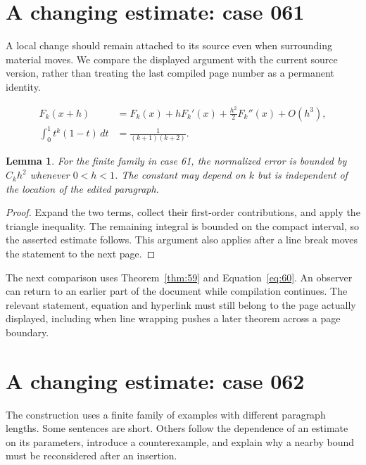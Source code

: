 \documentclass[a4paper,10pt]{article}
\newtheorem{lemma}[theorem]{Lemma}
\begin{document}
\lipsum[23]

\section{A changing estimate: case 061}\label{unit:60}
A local change should remain attached to its source even when surrounding material moves. We compare the displayed argument with the current source version, rather than treating the last compiled page number as a permanent identity.

\lipsum[1-2]
\begin{align}\label{eq:60}
 F_k(x+h)&=F_k(x)+hF_k'(x)+\frac{h^2}{2}F_k''(x)+O(h^3),\\
 \int_0^1 t^k(1-t)\,dt&=\frac{1}{(k+1)(k+2)}.
\end{align}
\begin{lemma}\label{thm:60}
For the finite family in case 61, the normalized error is bounded by $C_k h^2$ whenever $0<h<1$. The constant may depend on $k$ but is independent of the location of the edited paragraph.
\end{lemma}
\begin{proof}
Expand the two terms, collect their first-order contributions, and apply the
triangle inequality. The remaining integral is bounded on the compact interval,
so the asserted estimate follows. This argument also applies after a line break
moves the statement to the next page.
\end{proof}
The next comparison uses Theorem~\ref{thm:59} and Equation~\ref{eq:60}. An observer can return to an earlier part of the document while compilation continues. The relevant statement, equation and hyperlink must still belong to the page actually displayed, including when line wrapping pushes a later theorem across a page boundary.

\lipsum[3]

\section{A changing estimate: case 062}\label{unit:61}
The construction uses a finite family of examples with different paragraph lengths. Some sentences are short. Others follow the dependence of an estimate on its parameters, introduce a counterexample, and explain why a nearby bound must be reconsidered after an insertion.
\end{document}
